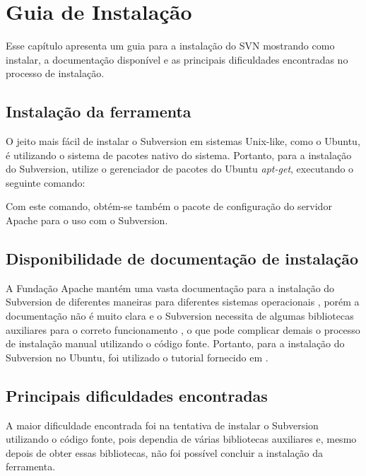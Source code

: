 \chapter[Guia de Instalação]{Guia de Instalação}
  
  Esse capítulo apresenta um guia para a instalação do SVN mostrando como instalar, a documentação disponível e as
  principais dificuldades encontradas no processo de instalação.
    

\section{Instalação da ferramenta}
    
    O jeito mais fácil de instalar o Subversion em sistemas Unix-like, como o Ubuntu,
    é utilizando o sistema de pacotes nativo do sistema. Portanto, para a instalação do Subversion,
    utilize o gerenciador de pacotes do Ubuntu \textit{apt-get}, executando o seguinte comando:
    
    \colorbox{Gray}{
      \begin{minipage}{0.6\linewidth}
      \end{minipage}
    }
    
    Com este comando, obtém-se também o pacote de configuração do servidor Apache para o uso com o Subversion.
  
\section{Disponibilidade de documentação de instalação}
  
  A Fundação Apache mantém uma vasta documentação para a instalação do Subversion de diferentes maneiras
  para diferentes sistemas operacionais \footnotemark, porém a documentação não é muito clara e o Subversion necessita
  de algumas bibliotecas auxiliares para o correto funcionamento \cite{svn-book}, o que pode complicar demais o processo
  de instalação manual utilizando o código fonte. Portanto, para a instalação do Subversion no Ubuntu, foi utilizado o
  tutorial fornecido em .
  
  
\section{Principais dificuldades encontradas}
  
  A maior dificuldade encontrada foi na tentativa de instalar o Subversion utilizando o código fonte, pois dependia de 
  várias bibliotecas auxiliares e, mesmo depois de obter essas bibliotecas, não foi possível concluir a instalação da
  ferramenta.